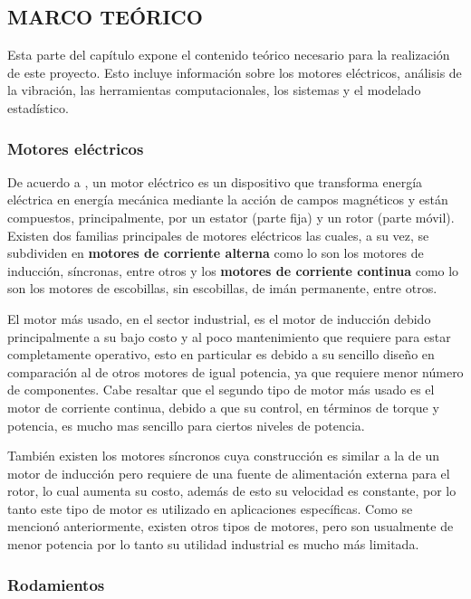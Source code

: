 \subsection{MARCO TEÓRICO}

Esta parte del capítulo expone el contenido teórico necesario para la
realización de este proyecto. Esto incluye información sobre los motores
eléctricos,  análisis de la vibración, las herramientas computacionales, los
sistemas y el modelado estadístico.



\subsubsection{ Motores eléctricos}

De acuerdo a \textcite{Fraile}, un motor eléctrico es un dispositivo que
transforma energía eléctrica en
energía mecánica mediante la acción de campos magnéticos y están compuestos,
principalmente, por un estator (parte fija) y un rotor (parte móvil).
Existen dos familias principales de motores eléctricos las cuales, a su vez,
se subdividen en \textbf{motores de corriente alterna} como lo son los  motores
de inducción, síncronas, entre otros y los \textbf{motores de corriente continua}
como lo son los motores de escobillas,  sin escobillas, de imán permanente,
entre otros.

El motor más usado, en el sector industrial, es el motor de inducción debido
principalmente a su bajo costo y al poco mantenimiento que requiere para estar
completamente operativo, esto en particular es debido a su sencillo diseño
en comparación al de otros motores de igual potencia, ya que requiere  menor
número de componentes. Cabe resaltar que el segundo tipo de motor más usado es
el motor de corriente
continua, debido a que su control, en términos de torque y potencia, es mucho
mas sencillo para ciertos niveles de potencia.

También existen los motores síncronos cuya construcción es similar a la de un
motor de inducción pero requiere de una fuente de alimentación externa
para el rotor, lo cual aumenta su costo, además de esto su velocidad es
constante, por lo tanto este tipo de motor es utilizado en aplicaciones
específicas. Como se mencionó anteriormente, existen otros tipos de motores,
pero son usualmente de menor potencia por
lo tanto su utilidad industrial es mucho más limitada.


\subsubsection*{Rodamientos}

